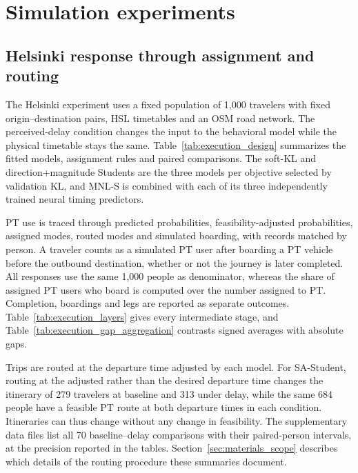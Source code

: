 \section{Simulation experiments}
\label{sec:supp_execution}
\subsection{Helsinki response through assignment and routing}
\label{sec:execution_revision}
The Helsinki experiment uses a fixed population of 1,000 travelers with fixed origin--destination pairs, HSL timetables and an OSM road network. The perceived-delay condition changes the input to the behavioral model while the physical timetable stays the same. Table~\ref{tab:execution_design} summarizes the fitted models, assignment rules and paired comparisons. The soft-KL and direction+magnitude Students are the three models per objective selected by validation KL, and MNL-S is combined with each of its three independently trained neural timing predictors.

PT use is traced through predicted probabilities, feasibility-adjusted probabilities, assigned modes, routed modes and simulated boarding, with records matched by person. A traveler counts as a simulated PT user after boarding a PT vehicle before the outbound destination, whether or not the journey is later completed. All responses use the same 1,000 people as denominator, whereas the share of assigned PT users who board is computed over the number assigned to PT. Completion, boardings and legs are reported as separate outcomes. Table~\ref{tab:execution_layers} gives every intermediate stage, and Table~\ref{tab:execution_gap_aggregation} contrasts signed averages with absolute gaps.



Trips are routed at the departure time adjusted by each model. For SA-Student, routing at the adjusted rather than the desired departure time changes the itinerary of 279 travelers at baseline and 313 under delay, while the same 684 people have a feasible PT route at both departure times in each condition. Itineraries can thus change without any change in feasibility. The supplementary data files list all 70 baseline--delay comparisons with their paired-person intervals, at the precision reported in the tables. Section~\ref{sec:materials_scope} describes which details of the routing procedure these summaries document.
\FloatBarrier


